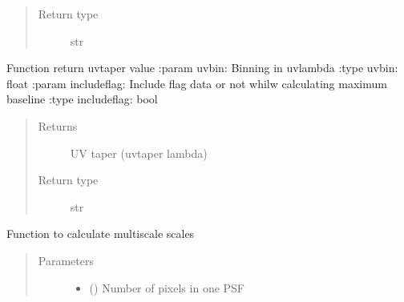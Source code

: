 \documentclass[letterpaper,10pt,english]{sphinxmanual}
\begin{document}
\begin{fulllineitems}
\begin{fulllineitems}
\begin{quote}
\begin{description}
\item[{Return type}] \leavevmode
\sphinxAtStartPar
str

\end{description}\end{quote}

\end{fulllineitems}


\begin{fulllineitems}
\label{\detokenize{paircars:paircars.basic_func.ImageBasic.calc_uvtaper}}
\sphinxAtStartPar
Function return uv\sphinxhyphen{}taper value
:param uvbin: Binning in uv\sphinxhyphen{}lambda
:type uvbin: float
:param includeflag: Include flag data or not whilw calculating maximum baseline
:type includeflag: bool
\begin{quote}\begin{description}
\item[{Returns}] \leavevmode
\sphinxAtStartPar
UV taper (uvtaper lambda)

\item[{Return type}] \leavevmode
\sphinxAtStartPar
str

\end{description}\end{quote}

\end{fulllineitems}


\begin{fulllineitems}
\label{\detokenize{paircars:paircars.basic_func.ImageBasic.choose_scales}}
\sphinxAtStartPar
Function to calculate multiscale scales
\begin{quote}\begin{description}
\item[{Parameters}] \leavevmode\begin{itemize}
\item {} 
\sphinxAtStartPar
{} () \textendash{} Number of pixels in one PSF


\end{itemize}
\end{description}
\end{quote}
\end{fulllineitems}
\end{fulllineitems}
\end{document}
